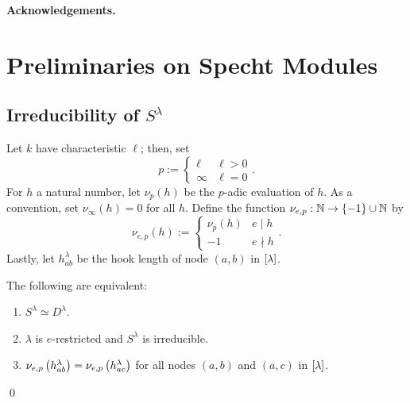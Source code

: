 \documentclass{amsart}
\newcommand{\fakesubsection}[1]{
  \vspace{7pt}
  \noindent \textbf{#1.}
}
\begin{document}
\fakesubsection{Acknowledgements}

\newpage
 
\section{Preliminaries on Specht Modules}
\subsection{Irreducibility of $S^\lambda$}
Let $k$ have characteristic $\ell$;
then, set
\[
  p := \begin{cases}
    \ell & \ell > 0\\
    \infty & \ell = 0
  \end{cases}.
\]  
For $h$ a natural number, let $\nu_p(h)$ be the $p$-adic evaluation of $h$.
As a convention, set $\nu_\infty(h) = 0$ for all $h$.
Define the function $\nu_{e,p} : \mathbb{N} \rightarrow \left\{ -1 \right\} \cup \mathbb{N}$ by
\[
  \nu_{e,p}(h) := \begin{cases}
    \nu_p(h) & e \mid h\\
    -1 & e \nmid h
  \end{cases}.
\]
Lastly, let $h_{ab}^\lambda$ be the hook length of node $(a,b)$ in $\left[ \lambda \right]$.

\begin{theorem}
  The following are equivalent:
  \begin{enumerate}
    \item $S^{\lambda} \simeq D^{\lambda}$.
    \item $\lambda$ is $e$-restricted and $S^\lambda$ is irreducible.
    \item $\nu_{e,p}\left( h_{ab}^\lambda \right) = \nu_{e,p}\left( h_{ac}^\lambda \right)$ for all nodes $(a,b)$ and $(a,c)$ in $\left[ \lambda \right]$.
  \end{enumerate}\qed
\end{theorem}
\end{document}
